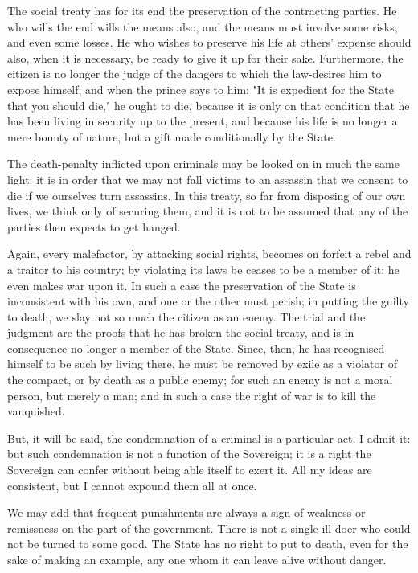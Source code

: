 \documentclass[12pt]{report}
\begin{document}
The social treaty has for its end the preservation of the contracting parties. He who wills the end wills the means also, and the means must involve some risks, and even some losses. He who wishes to preserve his life at others' expense should also, when it is necessary, be ready to give it up for their sake. Furthermore, the citizen is no longer the judge of the dangers to which the law-desires him to expose himself; and when the prince says to him: "It is expedient for the State that you should die," he ought to die, because it is only on that condition that he has been living in security up to the present, and because his life is no longer a mere bounty of nature, but a gift made conditionally by the State.

The death-penalty inflicted upon criminals may be looked on in much the same light: it is in order that we may not fall victims to an assassin that we consent to die if we ourselves turn assassins. In this treaty, so far from disposing of our own lives, we think only of securing them, and it is not to be assumed that any of the parties then expects to get hanged.

Again, every malefactor, by attacking social rights, becomes on forfeit a rebel and a traitor to his country; by violating its laws be ceases to be a member of it; he even makes war upon it. In such a case the preservation of the State is inconsistent with his own, and one or the other must perish; in putting the guilty to death, we slay not so much the citizen as an enemy. The trial and the judgment are the proofs that he has broken the social treaty, and is in consequence no longer a member of the State. Since, then, he has recognised himself to be such by living there, he must be removed by exile as a violator of the compact, or by death as a public enemy; for such an enemy is not a moral person, but merely a man; and in such a case the right of war is to kill the vanquished.

But, it will be said, the condemnation of a criminal is a particular act. I admit it: but such condemnation is not a function of the Sovereign; it is a right the Sovereign can confer without being able itself to exert it. All my ideas are consistent, but I cannot expound them all at once.

We may add that frequent punishments are always a sign of weakness or remissness on the part of the government. There is not a single ill-doer who could not be turned to some good. The State has no right to put to death, even for the sake of making an example, any one whom it can leave alive without danger.
\end{document}
